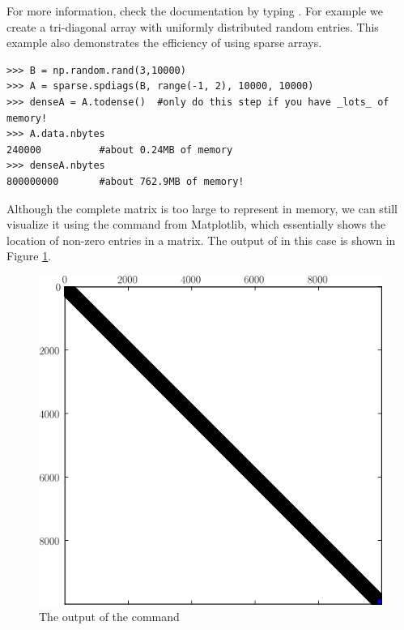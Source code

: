 For more information, check the documentation by typing .
For example we create a tri-diagonal array with uniformly distributed random entries.
This example also demonstrates the efficiency of using sparse arrays.
\begin{lstlisting}
>>> B = np.random.rand(3,10000)
>>> A = sparse.spdiags(B, range(-1, 2), 10000, 10000)
>>> denseA = A.todense()  #only do this step if you have _lots_ of memory!
>>> A.data.nbytes
240000          #about 0.24MB of memory
>>> denseA.nbytes
800000000       #about 762.9MB of memory!
\end{lstlisting}
Although the complete matrix is too large to represent in memory,
we can still visualize it using the  command from Matplotlib,
which essentially shows the location of non-zero entries in a matrix.
The output of  in this case is shown in Figure \ref{fig:mpl_spy}.
\begin{figure}[h]
\centering
\includegraphics[width=\textwidth]{spy.png}
\caption{The output of the  command}
\label{fig:mpl_spy}
\end{figure}

